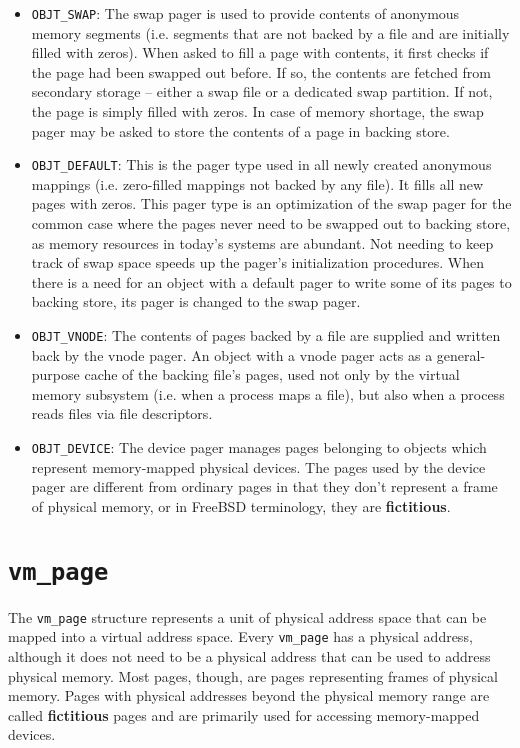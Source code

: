 \documentclass[shortabstract, english]{iithesis}
\begin{document}
\begin{itemize}

\item \texttt{OBJT_SWAP}: The swap pager is used to provide contents of
  anonymous memory segments (i.e. segments that are not backed by a file and are
  initially filled with zeros). When asked to fill a page with contents, it
  first checks if the page had been swapped out before. If so, the contents are
  fetched from secondary storage -- either a swap file or a dedicated swap
  partition. If not, the page is simply filled with zeros. In case of memory
  shortage, the swap pager may be asked to store the contents of a page in
  backing store.

\item \texttt{OBJT_DEFAULT}: This is the pager type used in all newly
  created anonymous mappings (i.e. zero-filled mappings not backed by any file).
  It fills all new pages with zeros. This pager type is an optimization of the
  swap pager for the common case where the pages never need to be swapped out to
  backing store, as memory resources in today's systems are abundant. Not
  needing to keep track of swap space speeds up the pager's initialization
  procedures. When there is a need for an object with a default pager to write
  some of its pages to backing store, its pager is changed to the swap pager.

\item \texttt{OBJT_VNODE}: The contents of pages backed by a file are
  supplied and written back by the vnode pager. An object with a vnode pager
  acts as a general-purpose cache of the backing file's pages, used not only by
  the virtual memory subsystem (i.e. when a process maps a file), but also when
  a process reads files via file descriptors.

\item \texttt{OBJT_DEVICE}: The device pager manages pages belonging to
  objects which represent memory-mapped physical devices. The pages used by the
  device pager are different from ordinary pages in that they don't represent a
  frame of physical memory, or in FreeBSD terminology, they are
  \textbf{fictitious}.
\end{itemize}

\section{\texttt{vm_page}}

The \texttt{vm_page} structure represents a unit of physical address
space that can be mapped into a virtual address space. Every
\texttt{vm_page} has a physical address, although it does not need to be
a physical address that can be used to address physical memory. Most pages,
though, are pages representing frames of physical memory. Pages with physical
addresses beyond the physical memory range are called \textbf{fictitious} pages
and are primarily used for accessing memory-mapped devices.
\end{document}
